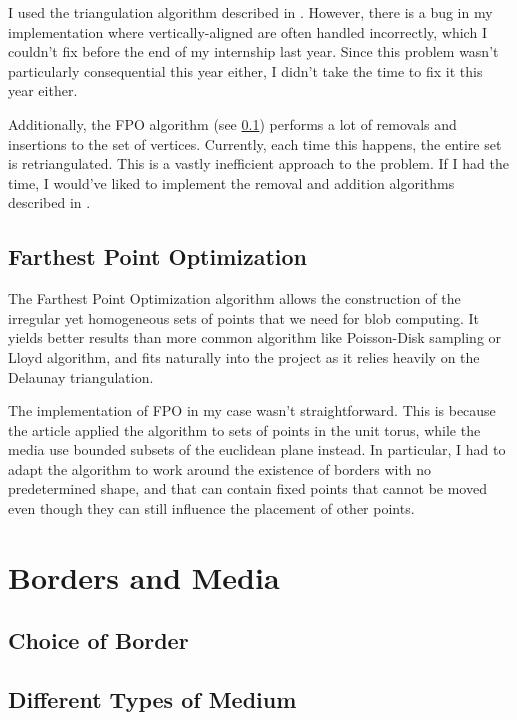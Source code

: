 \documentclass{article}
\begin{document}
I used the triangulation algorithm described in \cite{build_delaunay}. However, there is a bug in my implementation where vertically-aligned are often handled incorrectly, which I couldn't fix before the end of my internship last year. Since this problem wasn't particularly consequential this year either, I didn't take the time to fix it this year either.

Additionally, the FPO algorithm (see \ref{fpo}) performs a lot of removals and insertions to the set of vertices. Currently, each time this happens, the entire set is retriangulated. This is a vastly inefficient approach to the problem. If I had the time, I would've liked to implement the removal and addition algorithms described in \cite{build_delaunay, remove_delaunay}.

\subsection{Farthest Point Optimization}
\label{fpo}

The Farthest Point Optimization algorithm \supercite{FPO} allows the construction of the irregular yet homogeneous sets of points that we need for blob computing. It yields better results than more common algorithm like Poisson-Disk sampling or Lloyd algorithm, and fits naturally into the project as it relies heavily on the Delaunay triangulation.

The implementation of FPO in my case wasn't straightforward. This is because the article applied the algorithm to sets of points in the unit torus, while the media use bounded subsets of the euclidean plane instead. In particular, I had to adapt the algorithm to work around the existence of borders with no predetermined shape, and that can contain fixed points that cannot be moved even though they can still influence the placement of other points.

\renewcommand{\thesection}{\arabic{section}}
\setcounter{section}{0}

\section{Borders and Media}

\subsection{Choice of Border}

\subsection{Different Types of Medium}
\end{document}
